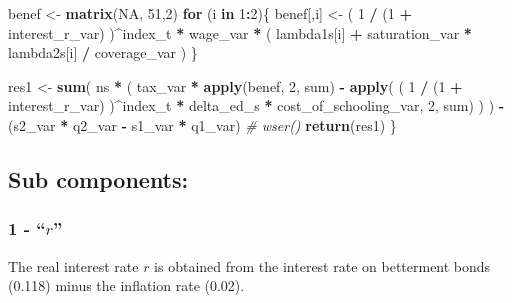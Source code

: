 \documentclass[]{article}
\newenvironment{Shaded}{\begin{snugshade}}{\end{snugshade}}
\newcommand{\CommentTok}[1]{\textcolor[rgb]{0.56,0.35,0.01}{\textit{#1}}}
\newcommand{\ControlFlowTok}[1]{\textcolor[rgb]{0.13,0.29,0.53}{\textbf{#1}}}
\newcommand{\DecValTok}[1]{\textcolor[rgb]{0.00,0.00,0.81}{#1}}
\newcommand{\KeywordTok}[1]{\textcolor[rgb]{0.13,0.29,0.53}{\textbf{#1}}}
\newcommand{\NormalTok}[1]{#1}
\newcommand{\OperatorTok}[1]{\textcolor[rgb]{0.81,0.36,0.00}{\textbf{#1}}}
\newcommand{\OtherTok}[1]{\textcolor[rgb]{0.56,0.35,0.01}{#1}}
\newcommand{\StringTok}[1]{\textcolor[rgb]{0.31,0.60,0.02}{#1}}
\begin{document}
\begin{Shaded}
\begin{Highlighting}[]
\NormalTok{  benef <-}\StringTok{ }\KeywordTok{matrix}\NormalTok{(}\OtherTok{NA}\NormalTok{, }\DecValTok{51}\NormalTok{,}\DecValTok{2}\NormalTok{)}
  \ControlFlowTok{for}\NormalTok{ (i }\ControlFlowTok{in} \DecValTok{1}\OperatorTok{:}\DecValTok{2}\NormalTok{)\{}
\NormalTok{  benef[,i] <-}\StringTok{ }\NormalTok{( }\DecValTok{1} \OperatorTok{/}\StringTok{ }\NormalTok{(}\DecValTok{1} \OperatorTok{+}\StringTok{ }\NormalTok{interest_r_var) )}\OperatorTok{^}\NormalTok{index_t }\OperatorTok{*}\StringTok{ }\NormalTok{wage_var }\OperatorTok{*}
\StringTok{                     }\NormalTok{( lambda1s[i] }\OperatorTok{+}\StringTok{ }\NormalTok{saturation_var }\OperatorTok{*}\StringTok{ }\NormalTok{lambda2s[i] }\OperatorTok{/}\StringTok{ }\NormalTok{coverage_var )}
\NormalTok{  \}}

\NormalTok{  res1 <-}\StringTok{ }\KeywordTok{sum}\NormalTok{( ns }\OperatorTok{*}\StringTok{ }\NormalTok{( tax_var }\OperatorTok{*}\StringTok{ }\KeywordTok{apply}\NormalTok{(benef, }\DecValTok{2}\NormalTok{, sum) }\OperatorTok{-}
\StringTok{            }\KeywordTok{apply}\NormalTok{( ( }\DecValTok{1} \OperatorTok{/}\StringTok{ }\NormalTok{(}\DecValTok{1} \OperatorTok{+}\StringTok{ }\NormalTok{interest_r_var) )}\OperatorTok{^}\NormalTok{index_t }\OperatorTok{*}
\StringTok{                     }\NormalTok{delta_ed_s }\OperatorTok{*}\StringTok{ }\NormalTok{cost_of_schooling_var, }\DecValTok{2}\NormalTok{, sum) )}
\NormalTok{          ) }\OperatorTok{-}\StringTok{ }\NormalTok{(s2_var }\OperatorTok{*}\StringTok{ }\NormalTok{q2_var  }\OperatorTok{-}\StringTok{ }\NormalTok{s1_var }\OperatorTok{*}\StringTok{ }\NormalTok{q1_var)}
\CommentTok{#  wser()}
  \KeywordTok{return}\NormalTok{(res1)   }
\NormalTok{\}}
\end{Highlighting}
\end{Shaded}

\hypertarget{sub-components}{%
\subsection{Sub components:}\label{sub-components}}

\hypertarget{r}{%
\subsubsection{\texorpdfstring{1 - ``\(r\)''}{1 - ``r''}}\label{r}}

The real interest rate \(r\) is obtained from the interest rate on
betterment bonds (0.118) minus the inflation rate (0.02).
\end{document}
